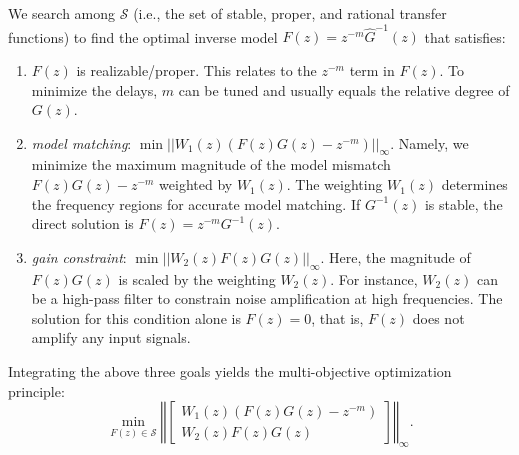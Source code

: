 \documentclass [11pt, proquest] {uwthesis}[2020/02/24]
\begin{document}
We search among $\mathcal{S}$ (i.e., the set of stable, proper, and rational transfer functions) to
find the optimal inverse model $F(z)=z^{-m}\hat{G}^{-1}(z)$ that
satisfies:
\begin{enumerate}
\item $F(z)$ is realizable/proper. This relates to the $z^{-m}$ term in
$F(z)$. To minimize the delays, $m$ can be tuned and usually equals
the relative degree of $G(z)$.
\item \emph{model matching}: $\min||W_{1}(z)(F(z)G(z)-z^{-m})||_{\infty}$.
Namely, we minimize the maximum magnitude of the model mismatch $F(z)G(z)-z^{-m}$
weighted by $W_{1}(z)$. The weighting $W_{1}(z)$ determines the
frequency regions for accurate model matching. If $G^{-1}(z)$ is
stable, the direct solution is $F(z)=z^{-m}G^{-1}(z)$. 
\item \emph{gain constraint}: $\min||W_{2}(z)F(z)G(z)||_{\infty}$. Here,
the magnitude of $F(z)G(z)$ is scaled by the weighting $W_{2}(z)$.
For instance, $W_{2}(z)$ can be a high-pass filter to constrain noise
amplification at high frequencies. The solution for this condition
alone is $F(z)=0$, that is, $F(z)$ does not amplify any input signals. 
\end{enumerate}
Integrating the above three goals yields the multi-objective optimization
principle:
\begin{equation}
\min_{F(z)\in\mathcal{S}}\left\Vert \left[\begin{array}{c}
W_{1}(z)(F(z)G(z)-z^{-m})\\
W_{2}(z)F(z)G(z)
\end{array}\right]\right\Vert _{\infty}.\label{eq:hinf-2}
\end{equation}
\end{document}
